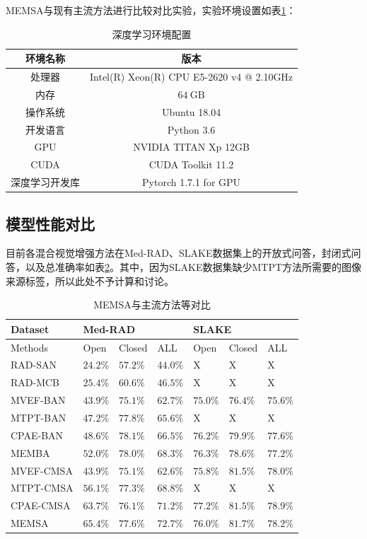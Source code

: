 MEMSA与现有主流方法进行比较对比实验，实验环境设置如表\ref{tab:env_para}：
\begin{table}
	\caption{\label{tab:env_para}深度学习环境配置}
	\centering
	\small
	\begin{tabular}{cc}
		\hline 环境名称 & 版本 \\
		\hline 处理器 & Intel(R) Xeon(R) CPU E5-2620 v4 @ 2.10GHz \\
		内存 & $64 \mathrm{~GB}$ \\
		操作系统 & Ubuntu 18.04 \\
		开发语言 & Python 3.6 \\
		GPU & NVIDIA TITAN Xp 12GB \\
		CUDA & CUDA Toolkit 11.2 \\
		深度学习开发库 & Pytorch 1.7.1 for GPU \\
		\hline
		\end{tabular}
\end{table}

\subsection{模型性能对比}
目前各混合视觉增强方法在Med-RAD、SLAKE数据集上的开放式问答，封闭式问答，以及总准确率如表\ref{tab:modal_red_cmp}。其中，因为SLAKE数据集缺少MTPT方法所需要的图像来源标签，所以此处不予计算和讨论。
\begin{table}
	\caption{\label{tab:modal_red_cmp}MEMSA与主流方法等对比}
	\centering
	\small
	\begin{tabular}{l|lll|lll}
		\hline Dataset & \multicolumn{3}{l}{\textbf{Med-RAD}} & \multicolumn{3}{|l}{\textbf{SLAKE}} \\ 
		\hline Methods & Open & Closed & ALL & Open & Closed & ALL\\
		\hline RAD-SAN\cite{lau2018dataset} & $24.2 \%$ & $57.2 \%$ & $44.0 \%$ & X & X & X\\
		RAD-MCB\cite{lau2018dataset} & $25.4 \%$ & $60.6 \%$ & $46.5 \%$ & X & X & X\\
		\hline MVEF-BAN \cite{nguyen2019overcoming} & $43.9 \%$ & $75.1 \%$ & $62.7 \%$ & $75.0 \%$ & $76.4 \%$ & $75.6 \%$ \\
		MTPT-BAN & $47.2 \%$ & $77.8 \%$ & $65.6 \%$ & X & X & X\\
		CPAE-BAN\cite{eslami2021does} & $48.6 \%$ & $78.1 \%$ & $66.5 \%$ & $76.2 \%$ & $79.9 \%$ & $77.6 \%$\\
		MEMBA & $52.0 \%$ & $78.0 \%$ & $68.3 \%$ & $76.3 \%$ & $78.6 \%$ & $77.2 \%$\\
		\hline MVEF-CMSA & $43.9 \%$ & $75.1 \%$ & $62.6 \%$ & $75.8 \%$ & $81.5 \%$ & $78.0 \%$\\
		MTPT-CMSA\cite{gong2021cross} & $56.1 \%$ & $77.3 \%$ & $68.8 \%$ & X & X & X\\
		CPAE-CMSA & $63.7 \%$ & $76.1 \%$ & $71.2 \%$ & $77.2 \%$ & $81.5 \%$ & $78.9 \%$\\
		MEMSA & $65.4 \%$ & $77.6 \%$ & $72.7 \%$ & $76.0 \%$ & $81.7 \%$ & $78.2 \%$\\
		\hline
		\end{tabular}
\end{table}

